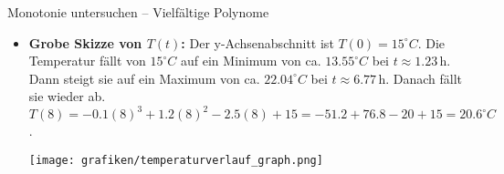 \begin{loesungsumgebung}{Monotonie untersuchen – Vielfältige Polynome}
\begin{enumerate}[label=(\alph*)]
\begin{itemize}
\begin{itemize}
        \end{itemize}
        \item \textbf{Grobe Skizze von $T(t)$:}
        Der y-Achsenabschnitt ist $T(0)=15^\circ C$.
        Die Temperatur fällt von $15^\circ C$ auf ein Minimum von ca. $13.55^\circ C$ bei $t \approx 1.23\,$h.
        Dann steigt sie auf ein Maximum von ca. $22.04^\circ C$ bei $t \approx 6.77\,$h.
        Danach fällt sie wieder ab. $T(8) = -0.1(8)^3 + 1.2(8)^2 - 2.5(8) + 15 = -51.2 + 76.8 - 20 + 15 = 20.6^\circ C$.
        \begin{center}
        \texttt{[image: grafiken/temperaturverlauf\_graph.png]}
        \label{fig:temperaturverlauf}
        \end{center}
    \end{itemize}
\end{enumerate}

\end{loesungsumgebung}


